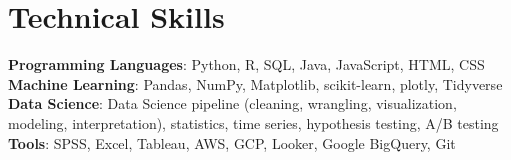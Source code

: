 \section{Technical Skills}
 \begin{itemize}[leftmargin=0.15in, label={}]
    \small{\item{
     \textbf{Programming Languages}{: Python, R, SQL, Java, JavaScript, HTML, CSS} \\
     \textbf{Machine Learning}{: Pandas, NumPy, Matplotlib, scikit-learn, plotly, Tidyverse}\\
     \textbf{Data Science}{: Data Science pipeline (cleaning, wrangling, visualization, modeling, interpretation), statistics, time series, hypothesis testing, A/B testing}\\
     \textbf{Tools}{: SPSS, Excel, Tableau, AWS, GCP, Looker, Google BigQuery, Git}\\
    }}
 \end{itemize}